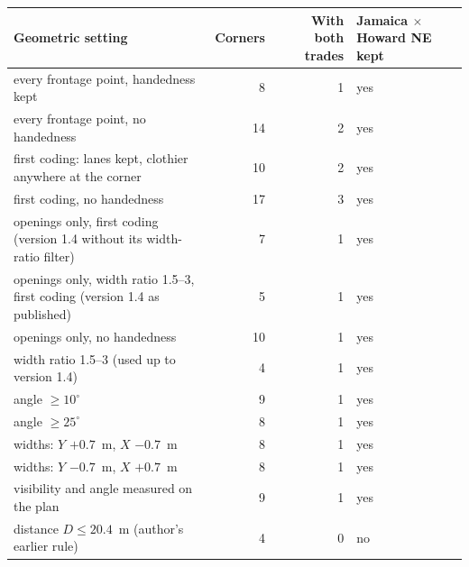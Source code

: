 \begin{tabular}{>{\raggedright\arraybackslash}p{7cm}rrl}
\toprule
Geometric setting & Corners & With both trades & Jamaica $\times$ Howard NE kept \\
\midrule
every frontage point, handedness kept & 8 & 1 & yes \\
every frontage point, no handedness & 14 & 2 & yes \\
first coding: lanes kept, clothier anywhere at the corner & 10 & 2 & yes \\
first coding, no handedness & 17 & 3 & yes \\
1857 openings only, first coding (version 1.4 without its width-ratio filter) & 7 & 1 & yes \\
1857 openings only, width ratio 1.5--3, first coding (version 1.4 as published) & 5 & 1 & yes \\
1857 openings only, no handedness & 10 & 1 & yes \\
width ratio 1.5--3 (used up to version 1.4) & 4 & 1 & yes \\
angle $\ge 10^\circ$ & 9 & 1 & yes \\
angle $\ge 25^\circ$ & 8 & 1 & yes \\
widths: $Y$ $+0.7$~m, $X$ $-0.7$~m & 8 & 1 & yes \\
widths: $Y$ $-0.7$~m, $X$ $+0.7$~m & 8 & 1 & yes \\
visibility and angle measured on the plan & 9 & 1 & yes \\
distance $D \le 20.4$~m (author's earlier rule) & 4 & 0 & no \\
\bottomrule
\end{tabular}
